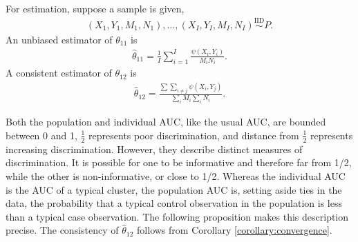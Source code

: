 \documentclass[12pt]{article}
\DeclareMathOperator{\AUC}{AUC}
\newcommand{\I}{I}
\renewcommand{\P}{P}
\newcommand{\cind}{\perp \!\!\! \perp}
\newcommand{\aucindiv}{\theta_{11}}%
\newcommand{\aucpop}{\theta_{12}}%
\newcommand{\aucindivhat}{\hat{\theta}_{11}}%
\newcommand{\aucpophat}{\hat{\theta}_{12}}%
\begin{document}
For estimation, suppose a sample is given,
\begin{align}
  (X_1,Y_1,M_1,N_1),\ldots,(X_\I,Y_\I,M_\I,N_\I) \overset{\text{IID}}{\sim} \P.
\end{align}
An unbiased estimator of $\aucindiv$ is
\begin{align}
  \aucindivhat = \frac{1}{I}\sum_{i=1}^\I \frac{\psi(X_i,Y_i)}{M_iN_i}. \label{defn:aucindivhat}
\end{align}
A consistent estimator of $\aucpop$ is
\begin{align}
  \aucpophat = \frac{\sum\sum_{i\neq j}\psi(X_i,Y_j)}{\sum_iM_i\sum_iN_i}. \label{defn:aucpophat}
\end{align}


Both the population and individual AUC, like the usual AUC, are bounded
between 0 and 1, $\frac{1}{2}$ represents poor discrimination, and
distance from $\frac{1}{2}$ represents increasing
discrimination. However, they describe distinct measures of
discrimination. It is possible for one to be informative and therefore
far from 1/2, while the other is non-informative, or close to 1/2.
Whereas the individual AUC is the AUC of a typical cluster, the
population AUC is, setting aside ties in the data,
the probability that a typical control observation in the population
is less than a typical case observation. The following proposition makes this description precise. The consistency of $\aucpophat$ follows from Corollary \ref{corollary:convergence}.

\end{document}
